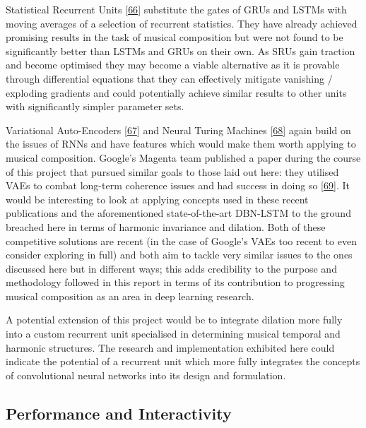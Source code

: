 \documentclass[12pt,]{article}
\begin{document}
Statistical Recurrent Units
{[}\protect\hyperlink{ref-oliva2017statistical}{66}{]} substitute the
gates of GRUs and LSTMs with moving averages of a selection of recurrent
statistics. They have already achieved promising results in the task of
musical composition but were not found to be significantly better than
LSTMs and GRUs on their own. As SRUs gain traction and become optimised
they may become a viable alternative as it is provable through
differential equations that they can effectively mitigate vanishing /
exploding gradients and could potentially achieve similar results to
other units with significantly simpler parameter sets.

Variational Auto-Encoders
{[}\protect\hyperlink{ref-roberts2017hierarchical}{67}{]} and Neural
Turing Machines {[}\protect\hyperlink{ref-graves2014neural}{68}{]} again
build on the issues of RNNs and have features which would make them
worth applying to musical composition. Google's Magenta team published a
paper during the course of this project that pursued similar goals to
those laid out here: they utilised VAEs to combat long-term coherence
issues and had success in doing so
{[}\protect\hyperlink{ref-roberts2018hierarchical}{69}{]}. It would be
interesting to look at applying concepts used in these recent
publications and the aforementioned state-of-the-art DBN-LSTM to the
ground breached here in terms of harmonic invariance and dilation. Both
of these competitive solutions are recent (in the case of Google's VAEs
too recent to even consider exploring in full) and both aim to tackle
very similar issues to the ones discussed here but in different ways;
this adds credibility to the purpose and methodology followed in this
report in terms of its contribution to progressing musical composition
as an area in deep learning research.

A potential extension of this project would be to integrate dilation
more fully into a custom recurrent unit specialised in determining
musical temporal and harmonic structures. The research and
implementation exhibited here could indicate the potential of a
recurrent unit which more fully integrates the concepts of convolutional
neural networks into its design and formulation.

\hypertarget{performance-and-interactivity}{%
\subsection{Performance and
Interactivity}\label{performance-and-interactivity}}
\end{document}
